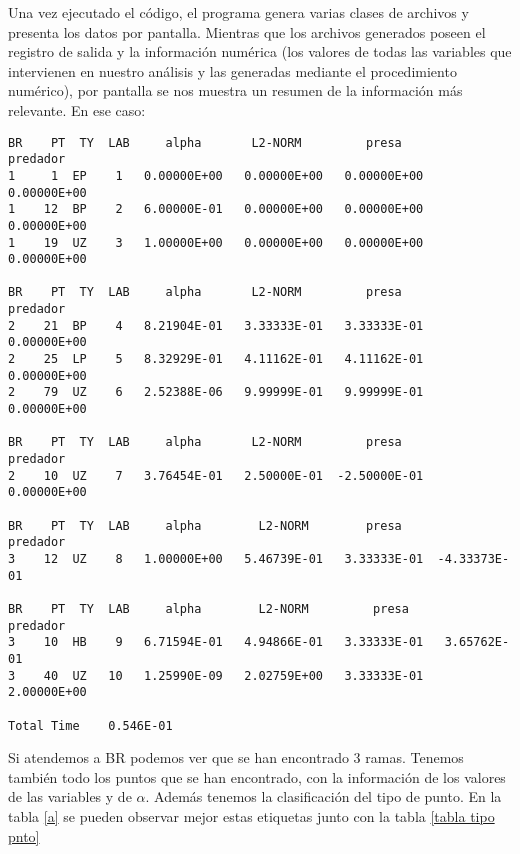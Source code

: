 Una vez ejecutado el código, el programa genera varias clases de archivos y presenta los datos por pantalla. Mientras que los archivos generados poseen el registro de salida y la información numérica (los valores de todas las variables que intervienen en nuestro análisis y las generadas mediante el procedimiento numérico), por pantalla se nos muestra un resumen de la información más relevante. En ese caso: 

\begin{lstlisting}
BR    PT  TY  LAB     alpha       L2-NORM         presa         predador    
1     1  EP    1   0.00000E+00   0.00000E+00   0.00000E+00   0.00000E+00
1    12  BP    2   6.00000E-01   0.00000E+00   0.00000E+00   0.00000E+00
1    19  UZ    3   1.00000E+00   0.00000E+00   0.00000E+00   0.00000E+00

BR    PT  TY  LAB     alpha       L2-NORM         presa         predador    
2    21  BP    4   8.21904E-01   3.33333E-01   3.33333E-01   0.00000E+00
2    25  LP    5   8.32929E-01   4.11162E-01   4.11162E-01   0.00000E+00
2    79  UZ    6   2.52388E-06   9.99999E-01   9.99999E-01   0.00000E+00

BR    PT  TY  LAB     alpha       L2-NORM         presa         predador    
2    10  UZ    7   3.76454E-01   2.50000E-01  -2.50000E-01   0.00000E+00

BR    PT  TY  LAB     alpha        L2-NORM        presa         predador    
3    12  UZ    8   1.00000E+00   5.46739E-01   3.33333E-01  -4.33373E-01

BR    PT  TY  LAB     alpha        L2-NORM         presa        predador    
3    10  HB    9   6.71594E-01   4.94866E-01   3.33333E-01   3.65762E-01
3    40  UZ   10   1.25990E-09   2.02759E+00   3.33333E-01   2.00000E+00

Total Time    0.546E-01
\end{lstlisting}

Si atendemos a BR podemos ver que se han encontrado 3 ramas. Tenemos también todo los puntos que se han encontrado, con la información de los valores de las variables y de $\alpha$. Además tenemos la clasificación del tipo de punto. En la tabla \ref{a} se pueden observar mejor estas etiquetas junto con la tabla \ref{tabla tipo pnto}

